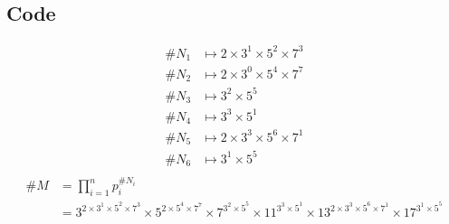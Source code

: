 \begin{problem}
\begin{answer}
    \subsection*{Code}

    \begin{align*}
      \#N_1 &\mapsto 2 \times 3^1 \times 5^2 \times 7^3 \\
      \#N_2 &\mapsto 2 \times 3^0 \times 5^4 \times 7^7 \\
      \#N_3 &\mapsto 3^2 \times 5^5 \\
      \#N_4 &\mapsto 3^3 \times 5^1 \\
      \#N_5 &\mapsto 2 \times 3^3 \times 5^6 \times 7^1 \\
      \#N_6 &\mapsto 3^1 \times 5^5 \\
    \end{align*}
    \begin{align*}
      \#M &= \prod_{i=1}^n p_i^{\#N_i} \\
          &= 3^{2 \times 3^1 \times 5^2 \times 7^3}
            \times 5^{2 \times 5^4 \times 7^7}
            \times 7^{3^2 \times 5^5}
            \times 11^{3^3 \times 5^1}
            \times 13^{2 \times 3^3 \times 5^6 \times 7^1}
            \times 17^{3^1 \times 5^5}
    \end{align*}
  \end{answer}
\end{problem}
